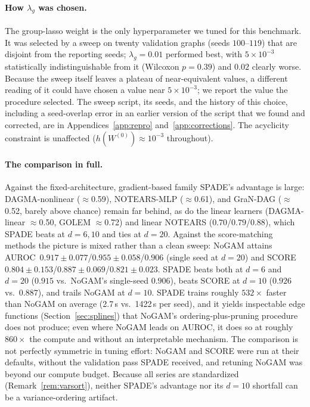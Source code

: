 \paragraph{How $\lambda_g$ was chosen.} The group-lasso weight is the only
hyperparameter we tuned for this benchmark. It was selected by a sweep on
twenty validation graphs (seeds $100$--$119$) that are disjoint from the
reporting seeds; $\lambda_g=0.01$ performed best, with $5\times10^{-3}$
statistically indistinguishable from it (Wilcoxon $p=0.39$) and $0.02$ clearly
worse. Because the sweep itself leaves a plateau of near-equivalent values, a
different reading of it could have chosen a value near $5\times10^{-3}$; we
report the value the procedure selected. The sweep script, its seeds, and the
history of this choice, including a seed-overlap error in an earlier version of
the script that we found and corrected, are in Appendices~\ref{app:repro}
and~\ref{app:corrections}. The acyclicity constraint is unaffected
($h(W^{(0)})\approx10^{-3}$ throughout).

\paragraph{The comparison in full.} Against the fixed-architecture,
gradient-based family SPADE's advantage is large: DAGMA-nonlinear
($\approx$0.59), NOTEARS-MLP ($\approx$0.61), and GraN-DAG ($\approx$0.52,
barely above chance) remain far behind, as do the linear learners
(DAGMA-linear $\approx$0.50, GOLEM $\approx$0.72) and linear NOTEARS
($0.70$/$0.79$/$0.88$), which SPADE beats at $d{=}6,10$ and ties at $d{=}20$.
Against the score-matching methods the picture is mixed rather than a clean
sweep: NoGAM attains AUROC~$0.917\pm0.077$/$0.955\pm0.058$/$0.906$ (single seed
at $d{=}20$) and SCORE $0.804\pm0.153$/$0.887\pm0.069$/$0.821\pm0.023$. SPADE
beats both at $d{=}6$ and $d{=}20$ ($0.915$ vs.\ NoGAM's single-seed $0.906$),
beats SCORE at $d{=}10$ ($0.926$ vs.\ $0.887$), and trails NoGAM at $d{=}10$.
SPADE trains roughly $532\times$ faster than NoGAM on average (2.7\,s vs.\
1422\,s per seed), and it yields inspectable edge functions
(Section~\ref{sec:splines}) that NoGAM's ordering-plus-pruning procedure does not
produce; even where NoGAM leads on AUROC, it does so at roughly $860\times$ the
compute and without an interpretable mechanism. The comparison is not perfectly
symmetric in tuning effort: NoGAM and SCORE were run at their defaults, without
the validation pass SPADE received, and retuning NoGAM was beyond our compute
budget. Because all series are standardized (Remark~\ref{rem:varsort}), neither
SPADE's advantage nor its $d{=}10$ shortfall can be a variance-ordering artifact.

